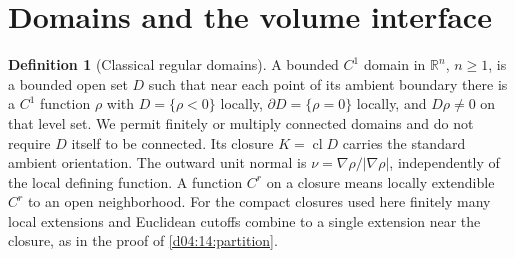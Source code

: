 \documentclass[11pt,oneside,openany]{book}
\theoremstyle{definition}
\newtheorem{definition}[theorem]{Definition}
\theoremstyle{remark}
\newcommand{\R}{\mathbb R}
\DeclareMathOperator{\cl}{cl}
\begin{document}
\section{Domains and the volume interface}
\begin{definition}[Classical regular domains]\label{d04:12:domains}
A bounded $C^1$ domain in $\R^n$, $n\ge1$, is a bounded open set $D$ such that near
each point of its ambient boundary there is a $C^1$ function $\rho$ with
$D=\{\rho<0\}$ locally, $\partial D=\{\rho=0\}$ locally, and
$D\rho\ne0$ on that level set. We permit finitely or multiply connected
domains and do not require $D$ itself to be connected. Its closure
$K=\cl D$ carries the standard ambient orientation. The outward unit normal
is $\nu=\nabla\rho/|\nabla\rho|$, independently of the local defining
function. A function $C^r$ on a closure means locally extendible $C^r$
to an open neighborhood. For the compact closures used here finitely many
local extensions and Euclidean cutoffs combine to a single extension near
the closure, as in the proof of \cref{d04:14:partition}.
\end{definition}
\end{document}
